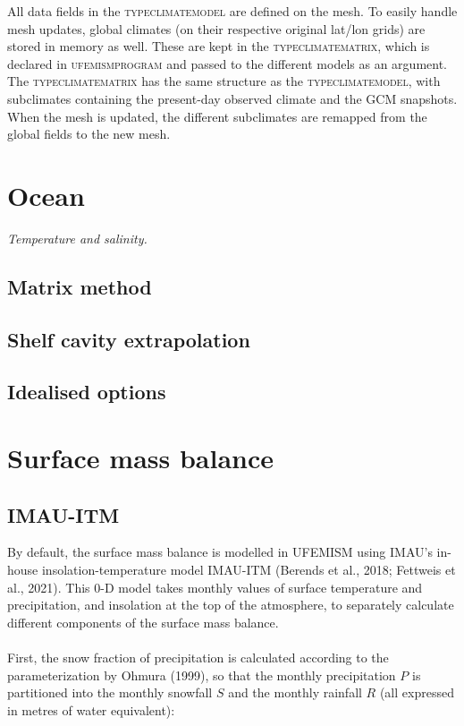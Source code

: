 \documentclass{article}
\begin{document}
All data fields in the \textsc{type\textunderscore climate\textunderscore model} are defined on the mesh. To easily handle mesh updates, global climates (on their respective original lat/lon grids) are stored in memory as well. These are kept in the \textsc{type\textunderscore climate\textunderscore matrix}, which is declared in \textsc{ufemism\textunderscore program} and passed to the different models as an argument. The \textsc{type\textunderscore climate\textunderscore matrix} has the same structure as the \textsc{type\textunderscore climate\textunderscore model}, with subclimates containing the present-day observed climate and the GCM snapshots. When the mesh is updated, the different subclimates are remapped from the global fields to the new mesh.

\newpage
\section{Ocean}

\textit{Temperature and salinity.}

\subsection{Matrix method}

\subsection{Shelf cavity extrapolation}

\subsection{Idealised options}

\newpage
\section{Surface mass balance}

\subsection{IMAU-ITM}

By default, the surface mass balance is modelled in UFEMISM using IMAU's in-house insolation-temperature model IMAU-ITM (Berends et al., 2018; Fettweis et al., 2021). This 0-D model takes monthly values of surface temperature and precipitation, and insolation at the top of the atmosphere, to separately calculate different components of the surface mass balance.\\
\\
First, the snow fraction of precipitation is calculated according to the parameterization by Ohmura (1999), so that the  monthly precipitation $P$ is partitioned into the monthly snowfall $S$ and the monthly rainfall $R$ (all expressed in metres of water equivalent):
\end{document}
